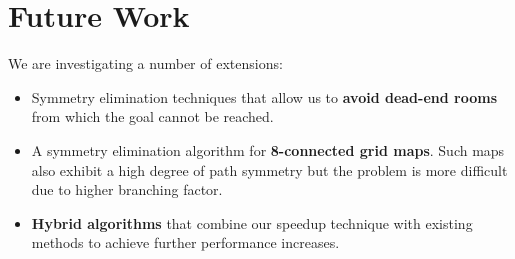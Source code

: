 

\section{Future Work}
We are investigating a number of extensions:
\begin{itemize}
\item{Symmetry elimination techniques that allow us to \textbf{avoid dead-end rooms} from which the goal cannot be reached. }
\item{A symmetry elimination algorithm for \textbf{8-connected grid maps}.
Such maps also exhibit a high degree of path symmetry but the problem is more
difficult due to higher branching factor.
}
\item{\textbf{Hybrid algorithms} that combine our speedup technique with existing methods
to achieve further performance increases.}
\end{itemize}

